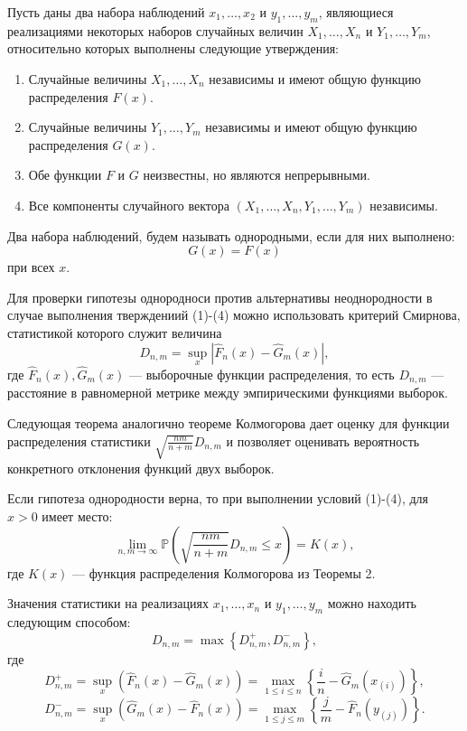Пусть даны два набора наблюдений $ x_1, \dots, x_2 $ и $ y_1, \dots, y_m $,
 являющиеся реализациями некоторых наборов случайных величин $ X_1, \dots, X_n $
 и $ Y_1, \dots, Y_m $, относительно которых выполнены следующие утверждения:

\begin{enumerate}
     \item Случайные величины $ X_1, \dots, X_n $ независимы и имеют общую функцию
      распределения $ F(x) $.
     \item Случайные величины $ Y_1, \dots, Y_m $ независимы и имеют общую функцию
     распределения $ G(x) $.
     \item Обе функции $ F $ и $ G $ неизвестны, но являются непрерывными.
     \item Все компоненты случайного вектора $ (X_1, \dots, X_n, Y_1, \dots, Y_m) $
      независимы.
\end{enumerate}
\begin{definition}
     Два набора наблюдений, будем называть однородными, если для них выполнено:
     $$ G(x) = F(x) $$
     при всех $ x $.
\end{definition}

Для проверки гипотезы однородноси против альтернативы неоднородности
 в случае выполнения тверждениий (1)-(4) можно использовать критерий Смирнова,
 статистикой которого служит величина
$$
 D_{n, m} = \displaystyle\sup_x \left| \hat{F}_n(x) - \hat{G}_m(x) \right|,
$$
 где $ \hat{F}_n(x), \hat{G}_m(x) $ --- выборочные функции распределения,
 то есть $ D_{n,m} $ --- расстояние в равномерной метрике между эмпирическими
 функциями выборок.

Следующая теорема аналогично теореме Колмогорова дает оценку для функции
 распределения статистики $ \sqrt{\frac{nm}{n + m}} D_{n,m} $ и позволяет оценивать
 вероятность конкретного отклонения функций двух выборок.
\begin{theorem}
     Если гипотеза однородности верна, то при выполнении условий (1)-(4), для
      $ x > 0 $ имеет место:
	$$
		\lim\limits_{n, m \to \infty} \mathbb{P} \left( \sqrt{\dfrac{n m}{n + m}}
           D_{n,m} \le x \right) = K(x),
	$$
     где $ K(x) $ --- функция распределения Колмогорова из Теоремы 2.
\end{theorem}

Значения статистики на реализациях $ x_1, \dots, x_n $ и $ y_1, \dots, y_m $ можно
находить следующим способом:
$$
D_{n,m} = \max \left\{ D_{n,m}^+, D_{n,m}^- \right\},
$$
где
$$
D_{n,m}^+ = \sup_{x}(\hat{F}_n(x) - \hat{G}_m(x)) = \max_{1 \le i \le n}
\left\{ \frac{i}{n} - \hat{G}_m(x_{(i)}) \right\},
$$
$$
D_{n,m}^- = \sup_{x}(\hat{G}_m(x) - \hat{F}_n(x)) = \max_{1 \le j \le m}
\left\{ \frac{j}{m} - \hat{F}_n(y_{(j)}) \right\}.
$$

